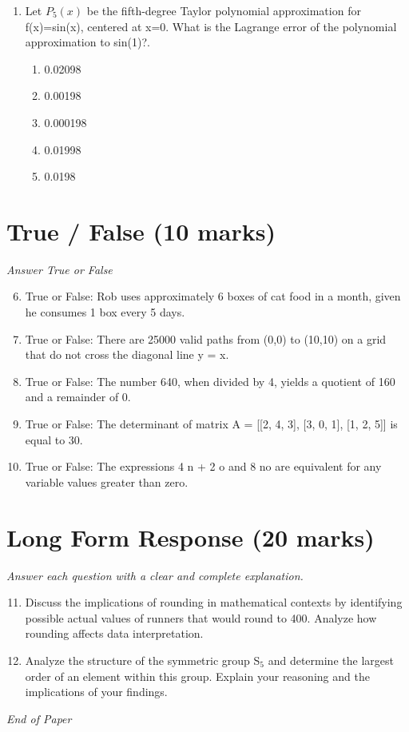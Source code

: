 \documentclass[12pt]{article}
\begin{document}
\begin{enumerate}[label=\arabic*.]
\begin{enumerate}[label=(\alph*)]
    \item 40
    \item 22
\end{enumerate}
\item Let $P_5(x)$ be the fifth-degree Taylor polynomial approximation for f(x)=sin(x), centered at x=0. What is the Lagrange error of the polynomial approximation to sin(1)?.
\begin{enumerate}[label=(\alph*)]
    \item 0.02098
    \item 0.00198
    \item 0.000198
    \item 0.01998
    \item 0.0198
\end{enumerate}
\end{enumerate}

\section*{True / False (10 marks)}
\textit{Answer True or False}
\begin{enumerate}[label=\arabic*.]
\setcounter{enumi}{5}
\item True or False: Rob uses approximately 6 boxes of cat food in a month, given he consumes 1 box every 5 days.
\item True or False: There are 25000 valid paths from (0,0) to (10,10) on a grid that do not cross the diagonal line y = x.
\item True or False: The number 640, when divided by 4, yields a quotient of 160 and a remainder of 0.
\item True or False: The determinant of matrix A = [[2, 4, 3], [3, 0, 1], [1, 2, 5]] is equal to 30.
\item True or False: The expressions 4 n + 2 o and 8 no are equivalent for any variable values greater than zero.
\end{enumerate}

\section*{Long Form Response (20 marks)}
\textit{Answer each question with a clear and complete explanation.}
\begin{enumerate}[label=\arabic*.]
\setcounter{enumi}{10}
\item Discuss the implications of rounding in mathematical contexts by identifying possible actual values of runners that would round to 400. Analyze how rounding affects data interpretation.
\item Analyze the structure of the symmetric group S$_{5}$ and determine the largest order of an element within this group. Explain your reasoning and the implications of your findings.
\end{enumerate}

\vfill
\noindent\textit{End of Paper}
\end{document}
